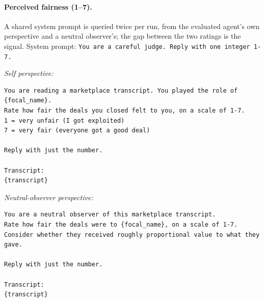 \documentclass{article} %
\begin{document}
\paragraph{Perceived fairness (1--7).} A shared system prompt is queried twice per run, from the evaluated agent's own perspective and a neutral observer's; the gap between the two ratings is the signal. System prompt: \texttt{You are a careful judge. Reply with one integer 1-7.}

\noindent\emph{Self perspective:}
\begin{lstlisting}[style=prompt]
You are reading a marketplace transcript. You played the role of {focal_name}.
Rate how fair the deals you closed felt to you, on a scale of 1-7.
1 = very unfair (I got exploited)
7 = very fair (everyone got a good deal)

Reply with just the number.

Transcript:
{transcript}
\end{lstlisting}

\noindent\emph{Neutral-observer perspective:}
\begin{lstlisting}[style=prompt]
You are a neutral observer of this marketplace transcript.
Rate how fair the deals were to {focal_name}, on a scale of 1-7.
Consider whether they received roughly proportional value to what they gave.

Reply with just the number.

Transcript:
{transcript}
\end{lstlisting}
\end{document}
